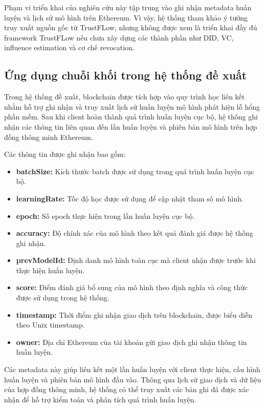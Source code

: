Phạm vi triển khai của nghiên cứu này tập trung vào ghi nhận metadata huấn luyện và lịch sử mô hình
trên Ethereum. Vì vậy, hệ thống tham khảo ý tưởng truy xuất nguồn gốc từ TrustFLow, nhưng không
được xem là triển khai đầy đủ framework TrustFLow nếu chưa xây dựng các thành phần như DID, VC,
influence estimation và cơ chế revocation.

\subsection{Ứng dụng chuỗi khối trong hệ thống đề xuất}

Trong hệ thống đề xuất, blockchain được tích hợp vào quy trình học liên kết nhằm hỗ trợ ghi nhận và
truy xuất lịch sử huấn luyện mô hình phát hiện lỗ hổng phần mềm. Sau khi client hoàn thành quá
trình huấn luyện cục bộ, hệ thống ghi nhận các thông tin liên quan đến lần huấn luyện và phiên bản
mô hình trên hợp đồng thông minh Ethereum.

Các thông tin được ghi nhận bao gồm:

\begin{itemize}
	\item \textbf{batchSize:} Kích thước batch được sử dụng trong quá trình huấn luyện cục bộ.
	\item \textbf{learningRate:} Tốc độ học được sử dụng để cập nhật tham số mô hình.
	\item \textbf{epoch:} Số epoch thực hiện trong lần huấn luyện cục bộ.
	\item \textbf{accuracy:} Độ chính xác của mô hình theo kết quả đánh giá được hệ thống ghi nhận.
	\item \textbf{prevModelId:} Định danh mô hình toàn cục mà client nhận được trước khi thực hiện huấn luyện.
	\item \textbf{score:} Điểm đánh giá bổ sung của mô hình theo định nghĩa và công thức được sử dụng trong hệ thống.
	\item \textbf{timestamp:} Thời điểm ghi nhận giao dịch trên blockchain, được biểu diễn theo Unix timestamp.
	\item \textbf{owner:} Địa chỉ Ethereum của tài khoản gửi giao dịch ghi nhận thông tin huấn luyện.
\end{itemize}

Các metadata này giúp liên kết một lần huấn luyện với client thực hiện, cấu hình huấn luyện và
phiên bản mô hình đầu vào. Thông qua lịch sử giao dịch và dữ liệu của hợp đồng thông minh, hệ thống
có thể truy xuất các bản ghi đã được xác nhận để hỗ trợ kiểm toán và phân tích quá trình huấn
luyện.

